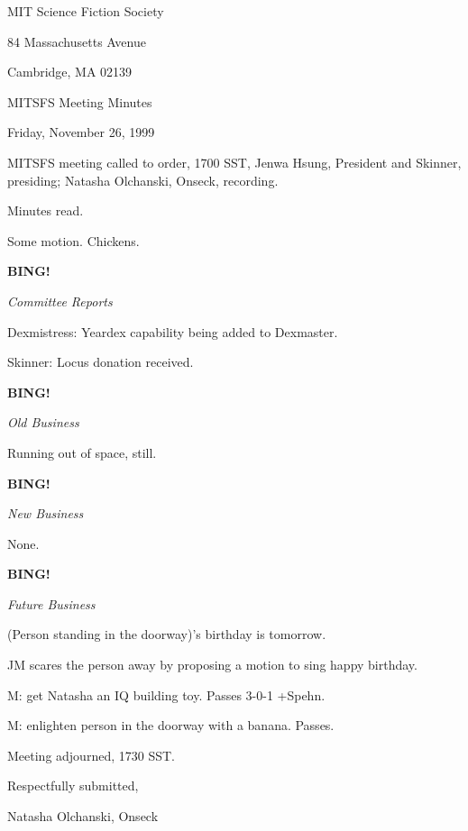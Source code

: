 \documentclass[12pt]{article}
\newcommand{\bing}{{\bf BING!} }
\newcommand{\goto}[1]{\bing \vskip 12pt \centerline{{\em{#1}}}}
\begin{document}
\begin{center}

MIT Science Fiction Society 

84 Massachusetts Avenue

Cambridge, MA 02139

\vspace{12pt}

MITSFS Meeting Minutes 

Friday, November 26, 1999

\end{center}
 
\vspace{18pt}

\setlength{\parskip}{6pt}

\noindent
MITSFS meeting called to order, 1700 SST,
Jenwa Hsung, President and Skinner, presiding; Natasha Olchanski, Onseck, recording.

Minutes read.

Some motion. Chickens.

\goto{Committee Reports}

Dexmistress: Yeardex capability being added to Dexmaster.

Skinner: Locus donation received.

\goto{Old Business}

Running out of space, still.

\goto{New Business}

None.

\goto{Future Business}

(Person standing in the doorway)'s birthday is tomorrow.

JM scares the person away by proposing a motion to sing happy birthday.

M: get Natasha an IQ building toy. Passes 3-0-1 +Spehn.

M: enlighten person in the doorway with a banana. Passes.

\vspace{12pt}

\noindent
Meeting adjourned, 1730 SST.

\vspace{18pt}

\centerline{Respectfully submitted,}
\centerline{Natasha Olchanski, Onseck}
\end{document}
